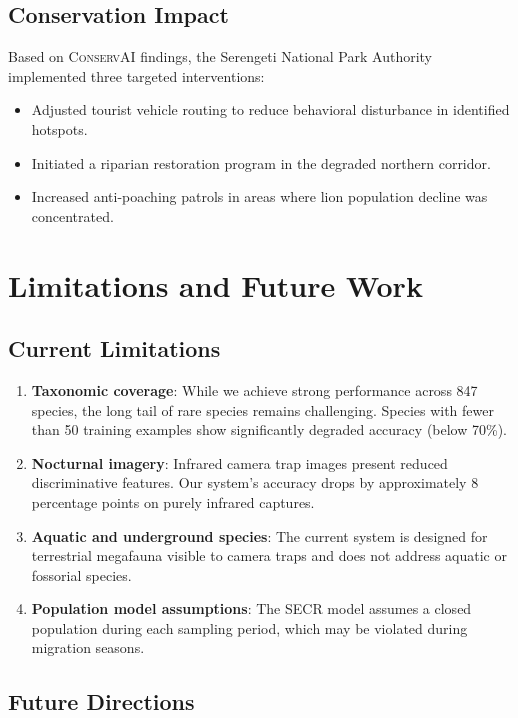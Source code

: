 \documentclass[11pt,letterpaper]{article}
\newcommand{\ConservAI}{\textsc{ConservAI}}
\begin{document}
\subsection{Conservation Impact}

Based on \ConservAI{} findings, the Serengeti National Park Authority implemented three targeted interventions:

\begin{itemize}[leftmargin=*]
    \item Adjusted tourist vehicle routing to reduce behavioral disturbance in identified hotspots.
    \item Initiated a riparian restoration program in the degraded northern corridor.
    \item Increased anti-poaching patrols in areas where lion population decline was concentrated.
\end{itemize}

\section{Limitations and Future Work}

\subsection{Current Limitations}

\begin{enumerate}[leftmargin=*]
    \item \textbf{Taxonomic coverage}: While we achieve strong performance across 847 species, the long tail of rare species remains challenging. Species with fewer than 50 training examples show significantly degraded accuracy (below 70\%).
    \item \textbf{Nocturnal imagery}: Infrared camera trap images present reduced discriminative features. Our system's accuracy drops by approximately 8 percentage points on purely infrared captures.
    \item \textbf{Aquatic and underground species}: The current system is designed for terrestrial megafauna visible to camera traps and does not address aquatic or fossorial species.
    \item \textbf{Population model assumptions}: The SECR model assumes a closed population during each sampling period, which may be violated during migration seasons.
\end{enumerate}

\subsection{Future Directions}
\end{document}
